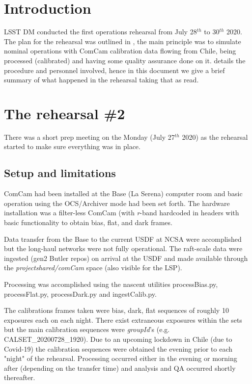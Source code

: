 \section{Introduction} \label{sec:intro}

LSST DM conducted the first operations rehearsal from July 28$^{th}$ to 30$^{th}$ 2020.
The plan for the rehearsal was outlined in , the main principle was to simulate
nominal operations with ComCam calibration data flowing from Chile, being processed (calibrated) 
and having some quality assurance done on it.
 details the procedure and personnel involved,
hence in this document we give a brief summary of what  happened in the rehearsal taking that as read.


\section{The rehearsal \#2}

There was a short prep meeting on the Monday (July 27$^{th}$ 2020) as the rehearsal started to make sure everything was in place.
\subsection{Setup and limitations} \label{sec:setup}

ComCam had been installed at the Base (La Serena) computer room and basic operation using the OCS/Archiver
mode had been set forth.  The hardware installation was a filter-less ComCam (with {\it r}-band hardcoded
in headers with basic functionality to obtain bias, flat, and dark frames.

Data transfer from the Base to the current USDF at NCSA were accomplished but the long-haul networks were not
fully operational.  The raft-scale data were ingested (gen2 Butler repos) on arrival at the USDF 
and made available through the {\it \/project\/shared/comCam} space (also visible for the LSP).  

Processing was accomplished using the nascent utilities processBias.py, processFlat.py, processDark.py and ingestCalib.py.

The calibrations frames taken were bias, dark, flat sequences of roughly 10 exposures each on each night.  There exist extraneous
exposures within the sets but the main calibration sequences were {\it groupId}'s (e.g. CALSET\_20200728\_1920).  Due to an 
upcoming lockdown in Chile (due to Covid-19) the calibration sequences were obtained the evening prior to each "night" of the 
rehearsal.  Processing occurred either in the evening or morning after (depending on the transfer time) and analysis and QA occurred
shortly thereafter.

